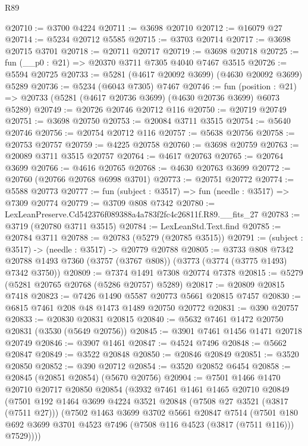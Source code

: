 \begin{lexlean}{R89}
\begin{coremodule}
@20710 := @3700 @4224
@20711 := @3698 @20710
@20712 := @16079 @27
@20714 := @5234 @20712 @5585
@20715 := @3703 @20714
@20717 := @3698 @20715 @3701
@20718 := @20711 @20717
@20719 := @3698 @20718
@20725 := fun (__p0 : @21) => @20370 @3711 @7305 @4040 @7467 @3515
@20726 := @5594 @20725
@20733 := @5281 (@4617 @20092 @3699) (@4630 @20092 @3699) @5289
@20736 := @5234 (@6043 @7305) @7467
@20746 := fun (position : @21) =>
  @20733 (@5281 (@4617 @20736 @3699) (@4630 @20736 @3699) @6073 @5289)
@20749 := @20726 @20746 @20712 @116
@20750 := @20719 @20749
@20751 := @3698 @20750
@20753 := @20084 @3711 @3515
@20754 := @5640 @20746
@20756 := @20754 @20712 @116
@20757 := @5638 @20756
@20758 := @20753 @20757
@20759 := @4225 @20758
@20760 := @3698 @20759
@20763 := @20089 @3711 @3515 @20757
@20764 := @4617 @20763
@20765 := @20764 @3699
@20766 := @4616 @20765
@20768 := @4630 @20763 @3699
@20772 := @20760 (@20766 @20768 @6998 @3701)
@20773 := @20751 @20772
@20774 := @5588 @20773
@20777 := fun (subject : @3517) => fun (needle : @3517) => @7309 @20774
@20779 := @3709 @808 @7342
@20780 := LexLeanPreserve.Cd542376f089388a4a783f2fc4c26811f.R89.__fits_27
@20783 := @3719 (@20780 @3711 @3515)
@20784 := LexLeanStd.Text.find
@20785 := @20784 @3711
@20788 := @20783 (@5279 (@20785 @3515))
@20791 := (subject : @3517) -> (needle : @3517) -> @20779 @20788
@20805 := @3733
    @808
    @7342
    @20788
    @1493
    @7360
    (@3757 (@3767 @808))
    (@3773 (@3774 (@3775 @1493) @7342 @3750))
@20809 := @7374 @1491 @7308 @20774 @7378
@20815 := @5279 (@5281 @20765 @20768 (@5286 @20757) @5289)
@20817 := @20809 @20815 @7418
@20823 := @7426 @1490 @5587 @20773 @5661 @20815 @7457
@20830 := @6815 @7461 @208 @48 @1473 @1489 @20750 @20772
@20831 := @390 @20757
@20833 := @20830 @20831 @20815
@20840 := @5632 @7461 @1472 @20750 @20831 (@3530 (@5649 @20756))
@20845 := @3901 @7461 @1456 @1471 @20718 @20749
@20846 := @3907 @1461
@20847 := @4524 @7496
@20848 := @5662 @20847
@20849 := @3522 @20848
@20850 := @20846 @20849
@20851 := @3520 @20850
@20852 := @390 @20712
@20854 := @3520 @20852 @6454
@20858 := @20845 (@20851 @20854) (@5670 @20756)
@20904 := @7501
    @1466
    @1470
    @20710
    @20717
    @20850
    @20854
    (@3932
      @7461
      @1461
      @1465
      @20710
      @20849
      (@7501
        @192
        @1464
        @3699
        @4224
        @3521
        @20848
        (@7508 @27 @3521 (@3817 (@7511 @27)))
        (@7502
          @1463
          @3699
          @3702
          @5661
          @20847
          @7514
          (@7501 @180 @692 @3699 @3701 @4523 @7496 (@7508 @116 @4523 (@3817 (@7511 @116))) @7529))))

\end{coremodule}
\end{lexlean}
